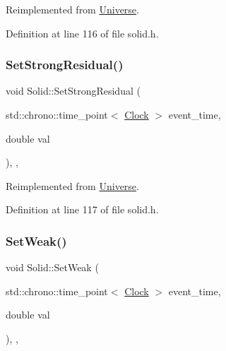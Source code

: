 Reimplemented from \hyperlink{class_universe_aafec97a231126b71c73ac1258609a284}{Universe}.



Definition at line 116 of file solid.\+h.

\mbox{\label{class_solid_a8b80ebe209fcd3afa4791968127753d0}} 
\subsubsection{\texorpdfstring{Set\+Strong\+Residual()}{SetStrongResidual()}}
{\footnotesize\ttfamily void Solid\+::\+Set\+Strong\+Residual (\begin{DoxyParamCaption}\item[{std\+::chrono\+::time\+\_\+point$<$ \hyperlink{universe_8h_a0ef8d951d1ca5ab3cfaf7ab4c7a6fd80}{Clock} $>$}]{event\+\_\+time,  }\item[{double}]{val }\end{DoxyParamCaption})\hspace{0.3cm}{\ttfamily [inline]}, {\ttfamily [final]}, {\ttfamily [virtual]}}



Reimplemented from \hyperlink{class_universe_a1b2d6197ddf3d613cc30bd04d22ed8b7}{Universe}.



Definition at line 117 of file solid.\+h.

\mbox{\label{class_solid_aa28e0f7e4de2fc0c1e28d385214296bf}} 
\subsubsection{\texorpdfstring{Set\+Weak()}{SetWeak()}}
{\footnotesize\ttfamily void Solid\+::\+Set\+Weak (\begin{DoxyParamCaption}\item[{std\+::chrono\+::time\+\_\+point$<$ \hyperlink{universe_8h_a0ef8d951d1ca5ab3cfaf7ab4c7a6fd80}{Clock} $>$}]{event\+\_\+time,  }\item[{double}]{val }\end{DoxyParamCaption})\hspace{0.3cm}{\ttfamily [inline]}, {\ttfamily [final]}, {\ttfamily [virtual]}}



